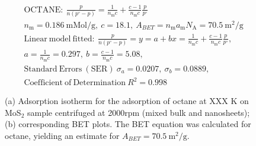 

\begin{align*}
&\mathrm{OCTANE:}\ \frac{p}{n(p^\circ-p)}=\frac{1}{n_\mathrm{m}c}+\frac{c-1}{n_\mathrm{m}c}\frac{p}{p^\circ}\\
&{n_\mathrm{m}}=0.186\ \mathrm{mMol/g},\ c=18.1,\ A_{BET}={n_\mathrm{m}}{a_\mathrm{m}}{N_\mathrm{A}}=70.5\ \mathrm{m}^2\mathrm{/g}\\
&\mathrm{Linear\ model\ fitted:}\ \frac{p}{n(p^\circ-p)}=y=a+bx=\frac{1}{n_\mathrm{m}c}+\frac{c-1}{n_\mathrm{m}c}\frac{p}{p^\circ},\\
&a=\frac{1}{n_\mathrm{m}c}=0.297,\ b=\frac{c-1}{n_\mathrm{m}c}=5.08,\\
&\mathrm{Standard\ Errors\ (SER)}\ \sigma_a=0.0207,\ \sigma_b=0.0889,\\
&\mathrm{Coefficient\ of\ Determination}\ R^2 = 0.998
\end{align*}


\begin{figure}[htb]
\hfill
{}
\caption{(a) Adsorption isotherm for the adsorption of octane at XXX K on MoS$_2$ 
sample centrifuged at 2000rpm (mixed bulk and nanosheets);
(b) corresponding BET plots. The BET equation was calculated for octane, yielding an estimate for $A_{BET}=70.5\ \mathrm{m}^2\mathrm{/g}$.}

\label{fig:sa-Nanosheets-Prep-I-3000rpm-8mg-01-3mm-30C-S1-SA-10ml}
\end{figure}


